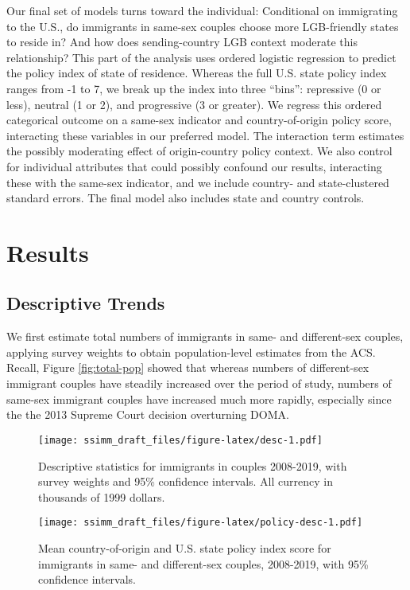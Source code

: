 \documentclass[
  11pt,
]{article}
\begin{document}
Our final set of models turns toward the individual: Conditional on immigrating to the U.S., do immigrants in same-sex couples choose more LGB-friendly states to reside in? And how does sending-country LGB context moderate this relationship? This part of the analysis uses ordered logistic regression to predict the policy index of state of residence. Whereas the full U.S. state policy index ranges from -1 to 7, we break up the index into three ``bins'': repressive (0 or less), neutral (1 or 2), and progressive (3 or greater). We regress this ordered categorical outcome on a same-sex indicator and country-of-origin policy score, interacting these variables in our preferred model. The interaction term estimates the possibly moderating effect of origin-country policy context. We also control for individual attributes that could possibly confound our results, interacting these with the same-sex indicator, and we include country- and state-clustered standard errors. The final model also includes state and country controls.

\hypertarget{results}{%
\section{Results}\label{results}}

\hypertarget{descriptive-trends}{%
\subsection{Descriptive Trends}\label{descriptive-trends}}

We first estimate total numbers of immigrants in same- and different-sex couples, applying survey weights to obtain population-level estimates from the ACS. Recall, Figure \ref{fig:total-pop} showed that whereas numbers of different-sex immigrant couples have steadily increased over the period of study, numbers of same-sex immigrant couples have increased much more rapidly, especially since the the 2013 Supreme Court decision overturning DOMA.

\begin{figure}
\centering
\texttt{[image: ssimm\_draft\_files/figure-latex/desc-1.pdf]}
\caption{\label{fig:desc}Descriptive statistics for immigrants in couples 2008-2019, with survey weights and 95\% confidence intervals. All currency in thousands of 1999 dollars.}
\end{figure}

\begin{figure}
\centering
\texttt{[image: ssimm\_draft\_files/figure-latex/policy-desc-1.pdf]}
\caption{\label{fig:policy-desc}Mean country-of-origin and U.S. state policy index score for immigrants in same- and different-sex couples, 2008-2019, with 95\% confidence intervals.}
\end{figure}
\end{document}
